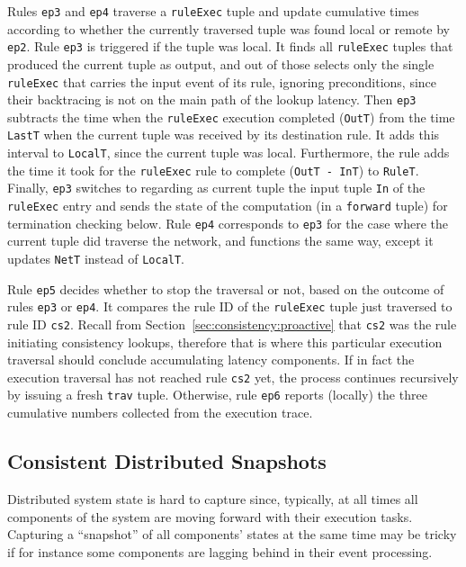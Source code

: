 \documentclass{sig-alt-full}
\newcommand{\ol}[1]{{\tt\footnotesize#1}}
\begin{document}
Rules \ol{ep3} and \ol{ep4} traverse a \ol{ruleExec}
tuple and update cumulative times according to whether
the currently traversed tuple was found local or
remote by \ol{ep2}.
Rule \ol{ep3} is triggered if the tuple was local.  It finds all
\ol{ruleExec} tuples that produced the current tuple
as output, and out of those selects only the single
\ol{ruleExec} that carries the input event of its
rule, ignoring preconditions, since their backtracing
is not on the main path of the lookup latency.  Then
\ol{ep3} subtracts the time when the \ol{ruleExec}
execution completed (\ol{OutT}) from the time
\ol{LastT} when the current tuple was received by its
destination rule.  It adds this interval to
\ol{LocalT}, since the current tuple was local.
Furthermore, the rule adds the time it
took for the \ol{ruleExec} rule to complete (\ol{OutT
- InT}) to \ol{RuleT}.  Finally, \ol{ep3} switches to
regarding as current tuple the input tuple \ol{In}
of the \ol{ruleExec} entry and sends the state of the
computation (in a \ol{forward} tuple) for termination
checking below.  Rule \ol{ep4}
corresponds to \ol{ep3} for the case where the
current tuple did traverse the network, and functions
the same way, except it updates \ol{NetT} instead of
\ol{LocalT}.

Rule \ol{ep5} decides whether to stop the traversal
or not, based on the outcome of rules \ol{ep3} or
\ol{ep4}.  It compares the rule ID of the
\ol{ruleExec}
tuple just traversed to rule ID \ol{cs2}.  Recall from
Section~\ref{sec:consistency:proactive} that \ol{cs2} was
the rule initiating consistency lookups, therefore
that is where this particular execution traversal
should conclude accumulating latency components.  If
in fact the execution traversal has not reached rule
\ol{cs2} yet, the process continues recursively by
issuing a fresh \ol{trav} tuple.
Otherwise, rule \ol{ep6} reports (locally) the three
cumulative numbers collected from the execution trace.










\subsection{Consistent Distributed Snapshots}
\label{sec:examples:snapshots}

Distributed system state is hard to capture since, typically, at all
times all components of the system are moving forward with their
execution tasks.  Capturing a
``snapshot'' of all components' states at the same time may be tricky
if for instance some components are lagging behind in their event
processing.
\end{document}
